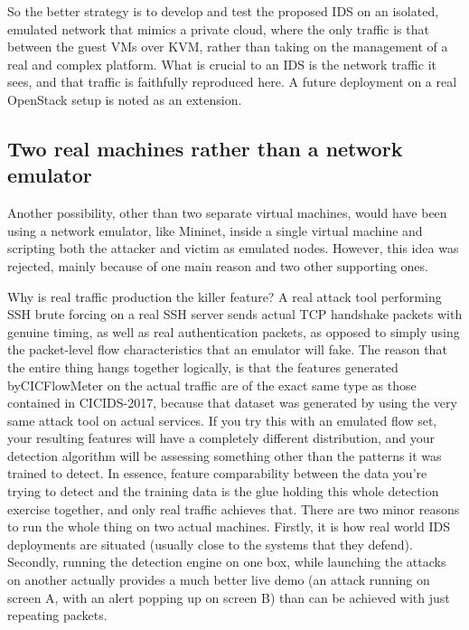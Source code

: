 So the better strategy is to develop and test the proposed IDS on an isolated, emulated network that mimics a private cloud, where the only traffic is that between the guest VMs over KVM, rather than taking on the management of a real and complex platform. What is crucial to an IDS is the network traffic it sees, and that traffic is faithfully reproduced here. A future deployment on a real OpenStack setup is noted as an extension.

\subsection{Two real machines rather than a network emulator}
\label{sec:conception_twovms}

Another possibility, other than two separate virtual machines, would have been using a network emulator, like Mininet, inside a single virtual machine and scripting both the attacker and victim as emulated nodes. However, this idea was rejected, mainly because of one main reason and two other supporting ones.

Why is real traffic production the killer feature?
A real attack tool performing SSH brute forcing on a real SSH server sends actual TCP handshake packets with genuine timing, as well as real authentication packets, as opposed to simply using the packet-level flow characteristics that an emulator will fake. The reason that the entire thing hangs together logically, is that the features generated byCICFlowMeter on the actual traffic are of the exact same type as those contained in CICIDS-2017, because that dataset was generated by using the very same attack tool on actual services. 
If you try this with an emulated flow set, your resulting features will have a completely different distribution, and your detection algorithm will be assessing something other than the patterns it was trained to detect. 
In essence, feature comparability between the data you're trying to detect and the training data is the glue holding this whole detection exercise together, and only real traffic achieves that. There are two minor reasons to run the whole thing on two actual machines. Firstly, it is how real world IDS deployments are situated (usually close to the systems that they defend). Secondly, running the detection engine on one box, while launching the attacks on another actually provides a much better live demo (an attack running on screen A, with an alert popping up on screen B) than can be achieved with just repeating packets.

